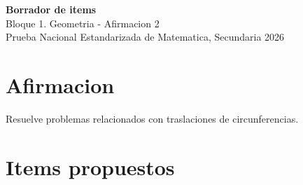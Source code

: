 \documentclass[12pt]{article}
\begin{document}
\begin{center}
  {\Large \textbf{Borrador de items}}\\
  {\large Bloque 1. Geometria - Afirmacion 2}\\[4pt]
  Prueba Nacional Estandarizada de Matematica, Secundaria 2026
\end{center}

\section*{Afirmacion}
Resuelve problemas relacionados con traslaciones de circunferencias.

\section*{Items propuestos}
\end{document}
